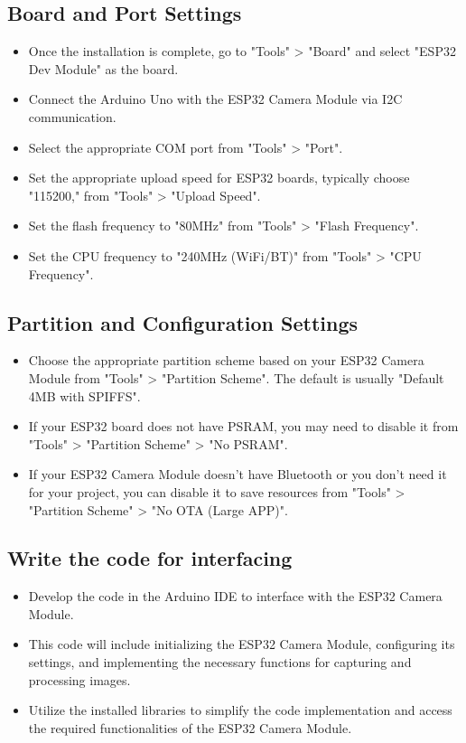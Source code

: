 \documentclass[a4paper,12pt,oneside]{book}
\begin{document}
\begin{enumerate}
\subsection*{Board and Port Settings}
\begin{itemize}
    \item Once the installation is complete, go to "Tools" > "Board" and select "ESP32 Dev Module" as the board.
    \item Connect the Arduino Uno with the ESP32 Camera Module via I2C communication.
    \item Select the appropriate COM port from "Tools" > "Port".
    \item Set the appropriate upload speed for ESP32 boards, typically choose "115200," from "Tools" > "Upload Speed".
    \item Set the flash frequency to "80MHz" from "Tools" > "Flash Frequency".
    \item Set the CPU frequency to "240MHz (WiFi/BT)" from "Tools" > "CPU Frequency".
\end{itemize}

\subsection*{Partition and Configuration Settings}
\begin{itemize}
    \item Choose the appropriate partition scheme based on your ESP32 Camera Module from "Tools" > "Partition Scheme". The default is usually "Default 4MB with SPIFFS".
    \item If your ESP32 board does not have PSRAM, you may need to disable it from "Tools" > "Partition Scheme" > "No PSRAM".
    \item If your ESP32 Camera Module doesn't have Bluetooth or you don't need it for your project, you can disable it to save resources from "Tools" > "Partition Scheme" > "No OTA (Large APP)".
\end{itemize}

\subsection{Write the code for interfacing}

\begin{itemize}
  \item Develop the code in the Arduino IDE to interface with the ESP32 Camera Module.
  \item This code will include initializing the ESP32 Camera Module, configuring its settings, and implementing the necessary functions for capturing and processing images.
  \item Utilize the installed libraries to simplify the code implementation and access the required functionalities of the ESP32 Camera Module.
\end{itemize}


\end{enumerate}
\end{document}

